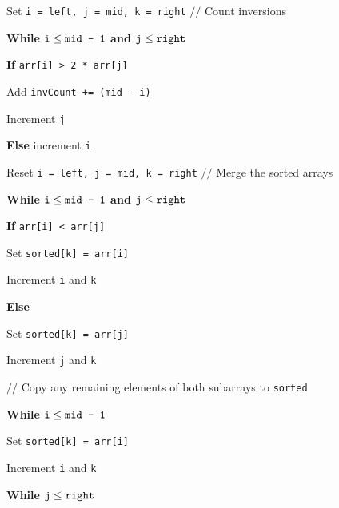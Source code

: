 \documentclass[11pt]{article}
\begin{document}
\begin{enumerate}[leftmargin=*,start=0]
\hspace{5mm} Set \verb|i = left, j = mid, k = right| $//$ Count inversions

\hspace{5mm} \textbf{While} $\verb|i| \leq \verb|mid - 1|$ \textbf{and} $\verb|j| \leq \verb|right|$ 

\hspace{10mm} \textbf{If} \verb|arr[i] > 2 * arr[j]|

\hspace{15mm} Add \verb|invCount += (mid - i)|

\hspace{15mm} Increment \verb|j|

\hspace{10mm} \textbf{Else} increment \verb|i|

\hspace{5mm} Reset \verb|i = left, j = mid, k = right| $//$ Merge the sorted arrays

\hspace{5mm} \textbf{While} $\verb|i| \leq \verb|mid - 1|$ \textbf{and} $\verb|j| \leq \verb|right|$ 

\hspace{10mm} \textbf{If} \verb|arr[i] < arr[j]|

\hspace{15mm} Set \verb|sorted[k] = arr[i]|

\hspace{15mm} Increment \verb|i| and \verb|k|

\hspace{10mm} \textbf{Else}

\hspace{15mm} Set \verb|sorted[k] = arr[j]|

\hspace{15mm} Increment \verb|j| and \verb|k|

\hspace{5mm} $//$ Copy any remaining elements of both subarrays to \verb|sorted|

\hspace{5mm} \textbf{While} $\verb|i| \leq \verb|mid - 1|$

\hspace{15mm} Set \verb|sorted[k] = arr[i]|

\hspace{15mm} Increment \verb|i| and \verb|k|

\hspace{5mm} \textbf{While} $\verb|j| \leq \verb|right|$


\end{enumerate}
\end{document}
